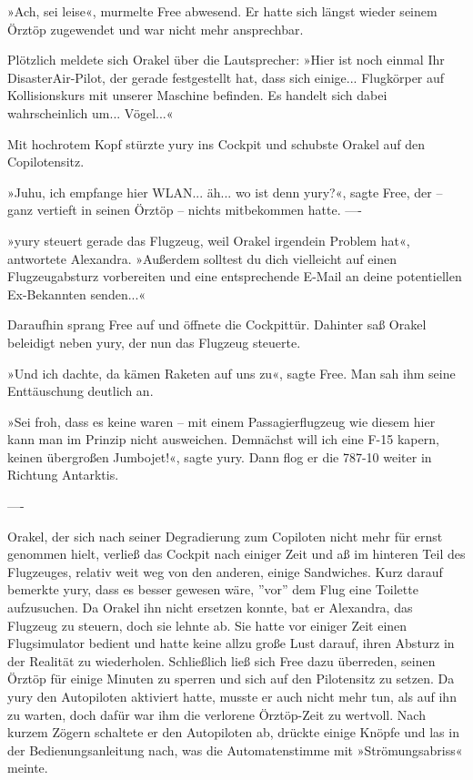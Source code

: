 »Ach, sei leise«, murmelte Free abwesend. Er hatte sich längst wieder seinem Örztöp zugewendet und war nicht mehr ansprechbar.

Plötzlich meldete sich Orakel über die Lautsprecher: »Hier ist noch einmal Ihr DisasterAir-Pilot, der gerade festgestellt hat, dass sich einige... Flugkörper auf Kollisionskurs mit unserer Maschine befinden. Es handelt sich dabei wahrscheinlich um... Vögel...«

Mit hochrotem Kopf stürzte yury ins Cockpit und schubste Orakel auf den Copilotensitz.

»Juhu, ich empfange hier WLAN... äh... wo ist denn yury?«, sagte Free, der – ganz vertieft in seinen Örztöp – nichts mitbekommen hatte.
----

»yury steuert gerade das Flugzeug, weil Orakel irgendein Problem hat«, antwortete Alexandra. »Außerdem solltest du dich vielleicht auf einen Flugzeugabsturz vorbereiten und eine entsprechende E-Mail an deine potentiellen Ex-Bekannten senden...«

Daraufhin sprang Free auf und öffnete die Cockpittür. Dahinter saß Orakel beleidigt neben yury, der nun das Flugzeug steuerte.

»Und ich dachte, da kämen Raketen auf uns zu«, sagte Free. Man sah ihm seine Enttäuschung deutlich an.

»Sei froh, dass es keine waren – mit einem Passagierflugzeug wie diesem hier kann man im Prinzip nicht ausweichen. Demnächst will ich eine F-15 kapern, keinen übergroßen Jumbojet!«, sagte yury. Dann flog er die 787-10 weiter in Richtung Antarktis.

----

Orakel, der sich nach seiner Degradierung zum Copiloten nicht mehr für ernst genommen hielt, verließ das Cockpit nach einiger Zeit und aß im hinteren Teil des Flugzeuges, relativ weit weg von den anderen, einige Sandwiches. Kurz darauf bemerkte yury, dass es besser gewesen wäre, ''vor'' dem Flug eine Toilette aufzusuchen. Da Orakel ihn nicht ersetzen konnte, bat er Alexandra, das Flugzeug zu steuern, doch sie lehnte ab. Sie hatte vor einiger Zeit einen Flugsimulator bedient und hatte keine allzu große Lust darauf, ihren Absturz in der Realität zu wiederholen. Schließlich ließ sich Free dazu überreden, seinen Örztöp für einige Minuten zu sperren und sich auf den Pilotensitz zu setzen. Da yury den Autopiloten aktiviert hatte, musste er auch nicht mehr tun, als auf ihn zu warten, doch dafür war ihm die verlorene Örztöp-Zeit zu wertvoll. Nach kurzem Zögern schaltete er den Autopiloten ab, drückte einige Knöpfe und las in der Bedienungsanleitung nach, was die Automatenstimme mit »Strömungsabriss« meinte.

